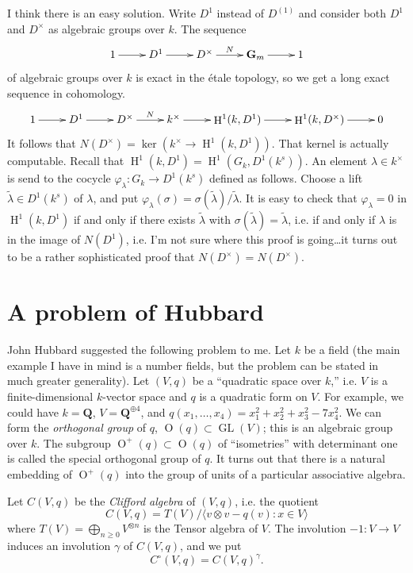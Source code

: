 \documentclass{article}
\DeclareMathOperator{\h}{H}
\DeclareMathOperator{\genlin}{GL}
\DeclareMathOperator{\ortho}{O}
\newcommand{\dG}{\mathbf{G}}
\newcommand{\dQ}{\mathbf{Q}}
\begin{document}
I think there is an easy solution. Write $D^1$ instead of $D^{(1)}$ and consider 
both $D^1$ and $D^\times$ as algebraic groups over $k$. The sequence 
\[\xymatrix{
  1 \ar[r] 
    & D^1 \ar[r] 
    & D^\times \ar[r]^-N 
    & \dG_m \ar[r] 
    & 1
}\]
of algebraic groups over $k$ is exact in the \'etale topology, so we get a 
long exact sequence in cohomology. 
\[\xymatrix{
  1 \ar[r] 
    & D^1 \ar[r] 
    & D^\times \ar[r]^-N 
    & k^\times \ar[r] 
    & \h^1(k,D^1) \ar[r] 
    & \h^1(k,D^\times) \ar[r] 
    & 0
}\]
It follows that $N(D^\times) = \ker(k^\times \to \h^1(k,D^1))$. That kernel is 
actually computable. Recall that $\h^1(k, D^1) = \h^1(G_k, D^1(k^s))$. An 
element $\lambda\in k^\times$ is send to the cocycle 
$\varphi_\lambda:G_k \to D^1(k^s)$ defined as follows. Choose a lift 
$\widetilde\lambda\in D^1(k^s)$ of $\lambda$, and put 
$\varphi_\lambda(\sigma) = \sigma(\widetilde\lambda) / \widetilde\lambda$. 
It is easy to check that $\varphi_\lambda=0$ in $\h^1(k, D^1)$ if and only if 
there exists $\widetilde\lambda$ with $\sigma(\widetilde\lambda)=\widetilde\lambda$, 
i.e. if and only if $\lambda$ is in the image of $N(D^1)$, i.e. I'm not sure 
where this proof is going\ldots it turns out to be a rather sophisticated proof 
that $N(D^\times) = N(D^\times)$. 





\section{A problem of Hubbard}

John Hubbard suggested the following problem to me. Let $k$ be a field (the 
main example I have in mind is a number fields, but the problem can be stated 
in much greater generality). Let $(V,q)$ be a ``quadratic space over $k$,'' 
i.e. $V$ is a finite-dimensional $k$-vector space and $q$ is a quadratic form 
on $V$. For example, we could have $k=\dQ$, $V=\dQ^{\oplus 4}$, and 
$q(x_1,\dots,x_4) = x_1^2 + x_2^2 + x_3^2 - 7 x_4^2$. We can form the 
\emph{orthogonal group} of $q$, $\ortho(q)\subset \genlin(V)$; this is an 
algebraic group over $k$. The subgroup $\ortho^+(q)\subset \ortho(q)$ of 
``isometries'' with determinant one is called the special orthogonal group of 
$q$. It turns out that there is a natural embedding of $\ortho^+(q)$ into the 
group of units of a particular associative algebra. 

Let $C(V,q)$ be the \emph{Clifford algebra} of $(V,q)$, i.e. the quotient 
\[
  C(V,q) = T(V) / \langle v\otimes v-q(v):x\in V\rangle 
\]
where $T(V)=\bigoplus_{n\geqslant 0} V^{\otimes n}$ is the Tensor algebra of 
$V$. The involution $-1:V\to V$ induces an involution $\gamma$ of $C(V,q)$, and 
we put 
\[
  C^\circ(V,q) = C(V,q)^\gamma .
\]
\end{document}

